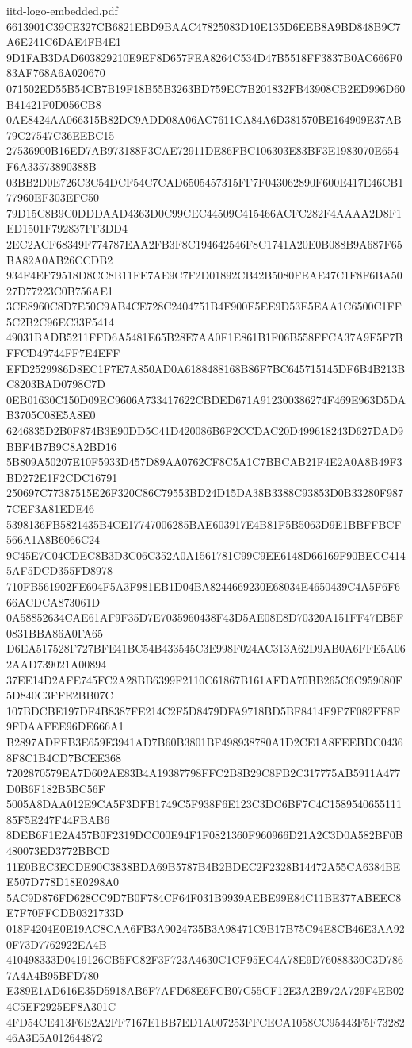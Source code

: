 \begin{filecontents*}[overwrite]{iitd-logo-embedded.pdf}
6613901C39CE327CB6821EBD9BAAC47825083D10E135D6EEB8A9BD848B9C7A6E241C6DAE4FB4E1
9D1FAB3DAD603829210E9EF8D657FEA8264C534D47B5518FF3837B0AC666F083AF768A6A020670
071502ED55B54CB7B19F18B55B3263BD759EC7B201832FB43908CB2ED996D60B41421F0D056CB8
0AE8424AA066315B82DC9ADD08A06AC7611CA84A6D381570BE164909E37AB79C27547C36EEBC15
27536900B16ED7AB973188F3CAE72911DE86FBC106303E83BF3E1983070E654F6A33573890388B
03BB2D0E726C3C54DCF54C7CAD6505457315FF7F043062890F600E417E46CB177960EF303EFC50
79D15C8B9C0DDDAAD4363D0C99CEC44509C415466ACFC282F4AAAA2D8F1ED1501F792837FF3DD4
2EC2ACF68349F774787EAA2FB3F8C194642546F8C1741A20E0B088B9A687F65BA82A0AB26CCDB2
934F4EF79518D8CC8B11FE7AE9C7F2D01892CB42B5080FEAE47C1F8F6BA5027D77223C0B756AE1
3CE8960C8D7E50C9AB4CE728C2404751B4F900F5EE9D53E5EAA1C6500C1FF5C2B2C96EC33F5414
49031BADB5211FFD6A5481E65B28E7AA0F1E861B1F06B558FFCA37A9F5F7BFFCD49744FF7E4EFF
EFD2529986D8EC1F7E7A850AD0A6188488168B86F7BC645715145DF6B4B213BC8203BAD0798C7D
0EB01630C150D09EC9606A733417622CBDED671A912300386274F469E963D5DAB3705C08E5A8E0
6246835D2B0F874B3E90DD5C41D420086B6F2CCDAC20D499618243D627DAD9BBF4B7B9C8A2BD16
5B809A50207E10F5933D457D89AA0762CF8C5A1C7BBCAB21F4E2A0A8B49F3BD272E1F2CDC16791
250697C77387515E26F320C86C79553BD24D15DA38B3388C93853D0B33280F9877CEF3A81EDE46
5398136FB5821435B4CE17747006285BAE603917E4B81F5B5063D9E1BBFFBCF566A1A8B6066C24
9C45E7C04CDEC8B3D3C06C352A0A1561781C99C9EE6148D66169F90BECC4145AF5DCD355FD8978
710FB561902FE604F5A3F981EB1D04BA8244669230E68034E4650439C4A5F6F666ACDCA873061D
0A58852634CAE61AF9F35D7E7035960438F43D5AE08E8D70320A151FF47EB5F0831BBA86A0FA65
D6EA517528F727BFE41BC54B433545C3E998F024AC313A62D9AB0A6FFE5A062AAD739021A00894
37EE14D2AFE745FC2A28BB6399F2110C61867B161AFDA70BB265C6C959080F5D840C3FFE2BB07C
107BDCBE197DF4B8387FE214C2F5D8479DFA9718BD5BF8414E9F7F082FF8F9FDAAFEE96DE666A1
B2897ADFFB3E659E3941AD7B60B3801BF498938780A1D2CE1A8FEEBDC04368F8C1B4CD7BCEE368
7202870579EA7D602AE83B4A19387798FFC2B8B29C8FB2C317775AB5911A477D0B6F182B5BC56F
5005A8DAA012E9CA5F3DFB1749C5F938F6E123C3DC6BF7C4C158954065511185F5E247F44FBAB6
8DEB6F1E2A457B0F2319DCC00E94F1F0821360F960966D21A2C3D0A582BF0B480073ED3772BBCD
11E0BEC3ECDE90C3838BDA69B5787B4B2BDEC2F2328B14472A55CA6384BEE507D778D18E0298A0
5AC9D876FD628CC9D7B0F784CF64F031B9939AEBE99E84C11BE377ABEEC8E7F70FFCDB0321733D
018F4204E0E19AC8CAA6FB3A9024735B3A98471C9B17B75C94E8CB46E3AA920F73D7762922EA4B
410498333D0419126CB5FC82F3F723A4630C1CF95EC4A78E9D76088330C3D7867A4A4B95BFD780
E389E1AD616E35D5918AB6F7AFD68E6FCB07C55CF12E3A2B972A729F4EB024C5EF2925EF8A301C
4FD54CE413F6E2A2FF7167E1BB7ED1A007253FFCECA1058CC95443F5F7328246A3E5A012644872

\end{filecontents*}
